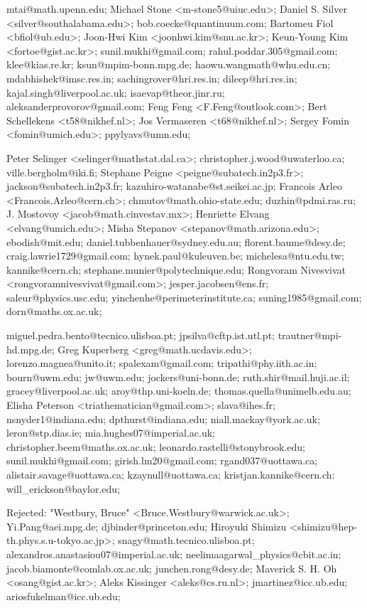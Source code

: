 \begin{description}

mtai@math.upenn.edu;
Michael Stone <m-stone5@uiuc.edu>; Daniel S. Silver <silver@southalabama.edu>;
bob.coecke@quantinuum.com;
Bartomeu Fiol <bfiol@ub.edu>;
Joon-Hwi Kim <joonhwi.kim@snu.ac.kr>;
Keun-Young Kim <fortoe@gist.ac.kr>;
sunil.mukhi@gmail.com; rahul.poddar.305@gmail.com;
klee@kias.re.kr; ksun@mpim-bonn.mpg.de; haowu.wangmath@whu.edu.cn;
mdabhishek@imsc.res.in; sachingrover@hri.res.in;
dileep@hri.res.in; kajal.singh@liverpool.ac.uk;
isaevap@theor.jinr.ru; aleksanderprovorov@gmail.com;
Feng Feng <F.Feng@outlook.com>;
Bert Schellekens <t58@nikhef.nl>;
 Jos Vermaseren <t68@nikhef.nl>;
 Sergey Fomin <fomin@umich.edu>; ppylyavs@umn.edu;

Peter Selinger <selinger@mathstat.dal.ca>;
christopher.j.wood@uwaterloo.ca;
ville.bergholm@iki.fi;
Stephane Peigne <peigne@subatech.in2p3.fr>;
jackson@subatech.in2p3.fr;
kazuhiro-watanabe@st.seikei.ac.jp;
Francois Arleo <Francois.Arleo@cern.ch>;
chmutov@math.ohio-state.edu; duzhin@pdmi.ras.ru;
J. Mostovoy <jacob@math.cinvestav.mx>;
Henriette Elvang <elvang@umich.edu>;
Misha Stepanov <stepanov@math.arizona.edu>;
ebodish@mit.edu; daniel.tubbenhauer@sydney.edu.au;
florent.baume@desy.de; craig.lawrie1729@gmail.com;
hynek.paul@kuleuven.be; michelesa@ntu.edu.tw;
kannike@cern.ch; stephane.munier@polytechnique.edu;
Rongvoram Nivesvivat <rongvoramnivesvivat@gmail.com>;
jesper.jacobsen@ens.fr; saleur@physics.usc.edu;
yinchenhe@perimeterinstitute.ca;
suning1985@gmail.com;
dorn@maths.ox.ac.uk;

miguel.pedra.bento@tecnico.ulisboa.pt;
jpsilva@cftp.ist.utl.pt; trautner@mpi-hd.mpg.de;
Greg Kuperberg <greg@math.ucdavis.edu>;
lorenzo.magnea@unito.it;
spalexam@gmail.com; tripathi@phy.iith.ac.in;
bourn@uwm.edu; jw@uwm.edu;
jockers@uni-bonn.de;
ruth.shir@mail.huji.ac.il;
gracey@liverpool.ac.uk;
aroy@thp.uni-koeln.de; thomas.quella@unimelb.edu.au;
Elisha Peterson <triathematician@gmail.com>;
slava@ihes.fr;
nsnyder1@indiana.edu; dpthurst@indiana.edu;
niall.mackay@york.ac.uk;
leron@stp.dias.ie;
mia.hughes07@imperial.ac.uk;
christopher.beem@maths.ox.ac.uk; leonardo.rastelli@stonybrook.edu;
sunil.mukhi@gmail.com; girish.lm20@gmail.com;
rgand037@uottawa.ca; alistair.savage@uottawa.ca; kzaynull@uottawa.ca;
kristjan.kannike@cern.ch:  %
will\_erickson@baylor.edu;

Rejected:
"Westbury, Bruce" <Bruce.Westbury@warwick.ac.uk>;
Yi.Pang@aei.mpg.de;
djbinder@princeton.edu;
Hiroyuki Shimizu <shimizu@hep-th.phys.s.u-tokyo.ac.jp>;
snagy@math.tecnico.ulisboa.pt;
alexandros.anastasiou07@imperial.ac.uk;
neelimaagarwal\_physics@cbit.ac.in; %
jacob.biamonte@comlab.ox.ac.uk;
junchen.rong@desy.de;
Maverick S. H. Oh <osang@gist.ac.kr>;
Aleks Kissinger <aleks@cs.ru.nl>;
jmartinez@icc.ub.edu; ariosfukelman@icc.ub.edu;


\end{description}
